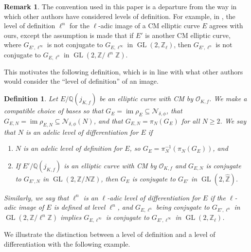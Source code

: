 \documentclass[11pt]{amsart}
\newtheorem{definition}[defn]{Definition}
\theoremstyle{definition}
\newtheorem{remark}[defn]{Remark}
\newcommand{\Q}{\mathbb{Q}}
\newcommand{\Z}{\mathbb{Z}}
\newcommand{\Of}{\mathcal{O}_{K,f}}
\newcommand{\GL}{\operatorname{GL}}
\DeclareMathOperator{\im}{im}  %
\begin{document}
\begin{remark}

The convention used in this paper is a departure from the way in which other authors have considered levels of definition. For example, in \cite[Proposition 12.1.4]{elladic}, the level of definition $\ell^n$ for the $\ell$-adic image of a CM elliptic curve $E$ agrees with ours, except the assumption is made that if $E'$ is another CM elliptic curve, where $G_{E', \ell^{\infty}}$ is not conjugate to $G_{E, \ell^{\infty}}$ in $\GL(2, \Z_\ell)$, then $G_{E', \ell^{n}}$ is not conjugate to $G_{E, \ell^{n}}$ in $\GL(2, \Z/\ell^n \Z)$.

This motivates the following definition, which is in line with what other authors would consider the ``level of definition'' of an image.
\end{remark}

\begin{definition}\label{def-level-of-dif}
    Let $E/\Q(j_{K,f})$ be an elliptic curve with CM by $\Of$. We make a compatible choice of bases so that $G_{E} = \im \rho_{E} \subseteq \mathcal{N}_{\delta, \phi}$, that $G_{E,N} = \im \rho_{E,N} \subseteq \mathcal{N}_{\delta, \phi}(N)$, and that $G_{E, N} = \pi_{N}(G_E)$ for all $N \geq 2$. We say that $N$ is an \emph{adelic level of differentiation} for $E$ if 
    \begin{enumerate}
        \item $N$ is an adelic level of definition for $E$, so $G_E = \pi_{N}^{-1}(\pi_N(G_E))$, and
        \item If $E'/\Q(j_{K,f})$ is an elliptic curve with CM by $\mathcal{O}_{K, f}$ and $G_{E,N}$ is conjugate to $G_{E',N}$ in $\GL(2,\Z/N\Z)$, then $G_{E}$ is conjugate to $G_{E'}$ in $\GL(2, \widehat{\Z})$.
 \end{enumerate}
Similarly, we say that $\ell^n$ is an \emph{$\ell$-adic level of differentiation} for $E$ if the $\ell$-adic image of $E$ is defined at level $\ell^n$, and $G_{E, \ell^n}$ being conjugate to $G_{E', \ell^n}$ in $\GL(2, \Z/\ell^n \Z)$ implies  $G_{E,\ell^\infty}$ is conjugate to $G_{E', \ell^{\infty}}$ in $\GL(2, \Z_{\ell})$.
\end{definition}

We illustrate the distinction between a level of definition and a level of differentiation with the following example.
\end{document}
